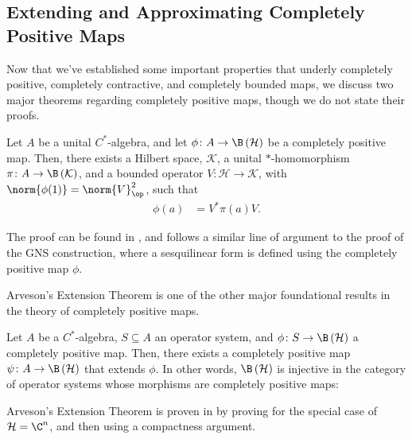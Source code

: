 \subsection{Extending and Approximating Completely Positive Maps}%
Now that we've established some important properties that underly completely positive, completely contractive, and completely bounded maps, we discuss two major theorems regarding completely positive maps, though we do not state their proofs.
\begin{theorem}\label{thm:stinespring_dilation}
  Let $A$ be a unital $C^{\ast}$-algebra, and let $\phi\colon A\rightarrow \B\left( \mathcal{H} \right)$ be a completely positive map. Then, there exists a Hilbert space, $\mathcal{K}$, a unital $\ast$-homomorphism $\pi\colon A\rightarrow \B\left( \mathcal{K} \right)$, and a bounded operator $V\colon \mathcal{H}\rightarrow \mathcal{K}$, with $\norm{\phi(1)} = \norm{V}_{\op}^2$, such that
  \begin{align*}
    \phi(a) &= V^{\ast}\pi(a)V.
  \end{align*}
\end{theorem}
The proof can be found in \cite[Chapter 4]{completely_bounded_maps_and_operator_algebras}, and follows a similar line of argument to the proof of the GNS construction, where a sesquilinear form is defined using the completely positive map $\phi$.\newline

Arveson's Extension Theorem is one of the other major foundational results in the theory of completely positive maps.
\begin{theorem}\label{thm:arveson}
  Let $A$ be a $C^{\ast}$-algebra, $S\subseteq A$ an operator system, and $\phi\colon S\rightarrow \B\left( \mathcal{H} \right)$ a completely positive map. Then, there exists a completely positive map $\psi\colon A\rightarrow \B\left( \mathcal{H} \right)$ that extends $\phi$. In other words, $\B\left( \mathcal{H} \right)$ is injective in the category of operator systems whose morphisms are completely positive maps:
  \begin{center}
  \end{center}
\end{theorem}
Arveson's Extension Theorem is proven in \cite[Chapter 7]{completely_bounded_maps_and_operator_algebras} by proving for the special case of $\mathcal{H} = \C^n$, and then using a compactness argument.\newline

